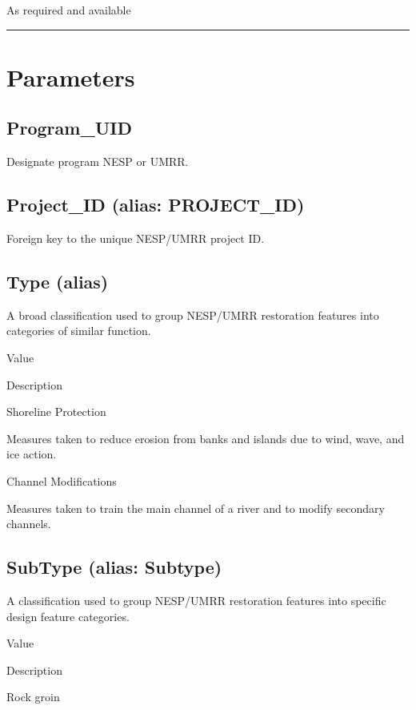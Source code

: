\documentclass[
  letterpaper,
  DIV=11,
  numbers=noendperiod]{scrreprt}
\begin{document}
As required and available

\begin{center}\rule{0.5\linewidth}{0.5pt}\end{center}

\section{Parameters}\label{parameters-13}

\subsection{Program\_UID}\label{program_uid-13}

Designate program NESP or UMRR.

\subsection{Project\_ID (alias:
PROJECT\_ID)}\label{project_id-alias-project_id-13}

Foreign key to the unique NESP/UMRR project ID.

\subsection{Type (alias)}\label{type-alias-12}

A broad classification used to group NESP/UMRR restoration features into
categories of similar function.

Value

Description

Shoreline Protection

Measures taken to reduce erosion from banks and islands due to wind,
wave, and ice action.

Channel Modifications

Measures taken to train the main channel of a river and to modify
secondary channels.

\subsection{SubType (alias: Subtype)}\label{subtype-alias-subtype-13}

A classification used to group NESP/UMRR restoration features into
specific design feature categories.

Value

Description

Rock groin
\end{document}
